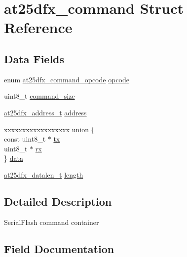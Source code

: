 \hypertarget{structat25dfx__command}{}\section{at25dfx\+\_\+command Struct Reference}
\label{structat25dfx__command}
\subsection*{Data Fields}
\begin{DoxyCompactItemize}
\item 
enum \mbox{\hyperlink{at25dfx_8c_a6f3ddc55f0728cd3909eee7b5d4ea571}{at25dfx\+\_\+command\+\_\+opcode}} \mbox{\hyperlink{structat25dfx__command_a2b5b9e841d577861efac73dfaea3bbb3}{opcode}}
\item 
uint8\+\_\+t \mbox{\hyperlink{structat25dfx__command_a524935062171f0d36ba3552566e448a2}{command\+\_\+size}}
\item 
\mbox{\hyperlink{group__asfdoc__common2__at25dfx__group_ga6797a814b041014cef23de480c9da9ef}{at25dfx\+\_\+address\+\_\+t}} \mbox{\hyperlink{structat25dfx__command_a50728cdb7f877630c4f1605013ce5497}{address}}
\item 
\begin{tabbing}
xx\=xx\=xx\=xx\=xx\=xx\=xx\=xx\=xx\=\kill
union \{\\
\>const uint8\_t $\ast$ \mbox{\hyperlink{structat25dfx__command_a24f3678e750daea4c5d322027cc8244d}{tx}}\\
\>uint8\_t $\ast$ \mbox{\hyperlink{structat25dfx__command_a3f0a8f4dd90ed4333466ccccacc10fda}{rx}}\\
\} \mbox{\hyperlink{structat25dfx__command_aa278fbfc4827c8708fac562bfa7ced88}{data}}\\

\end{tabbing}\item 
\mbox{\hyperlink{group__asfdoc__common2__at25dfx__group_gaebf176d512c4cc61390aef7159ddccb9}{at25dfx\+\_\+datalen\+\_\+t}} \mbox{\hyperlink{structat25dfx__command_a9cf615645e4992ade7ce819f1fef286a}{length}}
\end{DoxyCompactItemize}


\subsection{Detailed Description}
Serial\+Flash command container 

\subsection{Field Documentation}
\mbox{\label{structat25dfx__command_a50728cdb7f877630c4f1605013ce5497}} 
